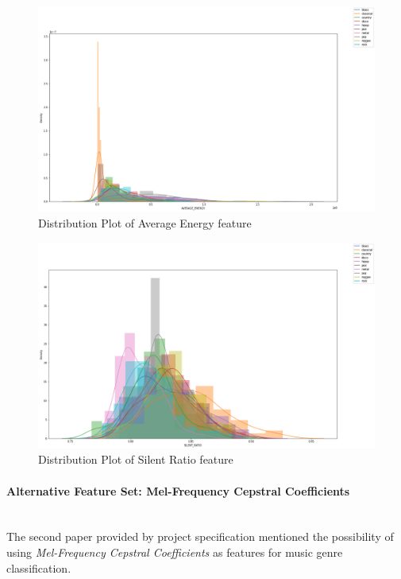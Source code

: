 \documentclass[12pt]{article}
\begin{document}
	\begin{figure}[H]
		\hspace{40pt}\includegraphics[scale=0.55]{visual_5_1}
		\caption{Distribution Plot of Average Energy feature}
	\end{figure}
	
	\begin{figure}[H]
		\hspace{40pt}\includegraphics[scale=0.55]{visual_6_1}
		\caption{Distribution Plot of Silent Ratio feature}
	\end{figure}

	\paragraph{Alternative Feature Set: Mel-Frequency Cepstral Coefficients}\mbox{}\\\newline
	The second paper provided by project specification \cite{classification} mentioned the possibility of using \textit{Mel-Frequency Cepstral Coefficients} as features for music genre classification.
	
\end{document}
